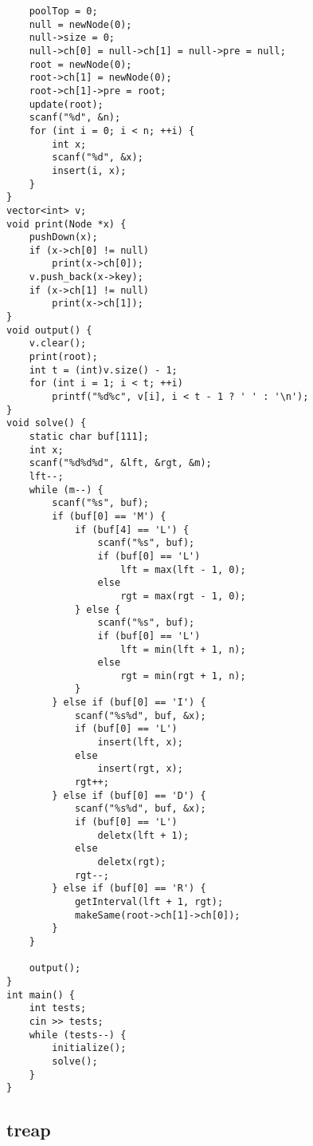 \documentclass{article}
\begin{document}
\begin{lstlisting}
    poolTop = 0;
    null = newNode(0);
    null->size = 0;
    null->ch[0] = null->ch[1] = null->pre = null;
    root = newNode(0);
    root->ch[1] = newNode(0);
    root->ch[1]->pre = root;
    update(root);
    scanf("%d", &n);
    for (int i = 0; i < n; ++i) {
        int x;
        scanf("%d", &x);
        insert(i, x);
    }
}
vector<int> v;
void print(Node *x) {
    pushDown(x);
    if (x->ch[0] != null)
        print(x->ch[0]);
    v.push_back(x->key);
    if (x->ch[1] != null)
        print(x->ch[1]);
}
void output() {
    v.clear();
    print(root);
    int t = (int)v.size() - 1;
    for (int i = 1; i < t; ++i)
        printf("%d%c", v[i], i < t - 1 ? ' ' : '\n');
}
void solve() {
    static char buf[111];
    int x;
    scanf("%d%d%d", &lft, &rgt, &m);
    lft--;
    while (m--) {
        scanf("%s", buf);
        if (buf[0] == 'M') {
            if (buf[4] == 'L') {
                scanf("%s", buf);
                if (buf[0] == 'L')
                    lft = max(lft - 1, 0);
                else
                    rgt = max(rgt - 1, 0);
            } else {
                scanf("%s", buf);
                if (buf[0] == 'L')
                    lft = min(lft + 1, n);
                else
                    rgt = min(rgt + 1, n);
            }
        } else if (buf[0] == 'I') {
            scanf("%s%d", buf, &x);
            if (buf[0] == 'L')
                insert(lft, x);
            else
                insert(rgt, x);
            rgt++;
        } else if (buf[0] == 'D') {
            scanf("%s%d", buf, &x);
            if (buf[0] == 'L')
                deletx(lft + 1);
            else
                deletx(rgt);
            rgt--;
        } else if (buf[0] == 'R') {
            getInterval(lft + 1, rgt);
            makeSame(root->ch[1]->ch[0]);
        }
    }

    output();
}
int main() {
    int tests;
    cin >> tests;
    while (tests--) {
        initialize();
        solve();
    }
}
\end{lstlisting}

\subsection{treap}
\end{document}
